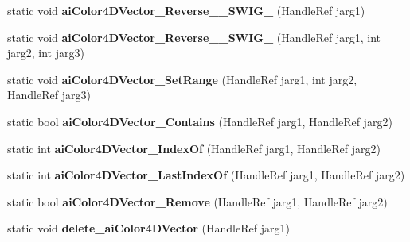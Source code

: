 \begin{DoxyCompactItemize}
\item 
\hypertarget{class_assimp_p_i_n_v_o_k_e_aec77b256902e407fd779185eaf99868b}{static void {\bfseries ai\+Color4\+D\+Vector\+\_\+\+Reverse\+\_\+\+\_\+\+S\+W\+I\+G\+\_} (Handle\+Ref jarg1)}\label{class_assimp_p_i_n_v_o_k_e_aec77b256902e407fd779185eaf99868b}

\item 
\hypertarget{class_assimp_p_i_n_v_o_k_e_acd0caab50df5baad27c1b5d63560a4d6}{static void {\bfseries ai\+Color4\+D\+Vector\+\_\+\+Reverse\+\_\+\+\_\+\+S\+W\+I\+G\+\_} (Handle\+Ref jarg1, int jarg2, int jarg3)}\label{class_assimp_p_i_n_v_o_k_e_acd0caab50df5baad27c1b5d63560a4d6}

\item 
\hypertarget{class_assimp_p_i_n_v_o_k_e_a41fd1f3f39d4473d14f527292f90e19e}{static void {\bfseries ai\+Color4\+D\+Vector\+\_\+\+Set\+Range} (Handle\+Ref jarg1, int jarg2, Handle\+Ref jarg3)}\label{class_assimp_p_i_n_v_o_k_e_a41fd1f3f39d4473d14f527292f90e19e}

\item 
\hypertarget{class_assimp_p_i_n_v_o_k_e_a7430a96d3bccd3f5916248d3041c484f}{static bool {\bfseries ai\+Color4\+D\+Vector\+\_\+\+Contains} (Handle\+Ref jarg1, Handle\+Ref jarg2)}\label{class_assimp_p_i_n_v_o_k_e_a7430a96d3bccd3f5916248d3041c484f}

\item 
\hypertarget{class_assimp_p_i_n_v_o_k_e_a5a31cecb0d33d502757bef87f046ee74}{static int {\bfseries ai\+Color4\+D\+Vector\+\_\+\+Index\+Of} (Handle\+Ref jarg1, Handle\+Ref jarg2)}\label{class_assimp_p_i_n_v_o_k_e_a5a31cecb0d33d502757bef87f046ee74}

\item 
\hypertarget{class_assimp_p_i_n_v_o_k_e_a1b23a1199e11566c93c5d837d62f5f83}{static int {\bfseries ai\+Color4\+D\+Vector\+\_\+\+Last\+Index\+Of} (Handle\+Ref jarg1, Handle\+Ref jarg2)}\label{class_assimp_p_i_n_v_o_k_e_a1b23a1199e11566c93c5d837d62f5f83}

\item 
\hypertarget{class_assimp_p_i_n_v_o_k_e_ab804b4e9c7ec05df9d90be1cc84b0347}{static bool {\bfseries ai\+Color4\+D\+Vector\+\_\+\+Remove} (Handle\+Ref jarg1, Handle\+Ref jarg2)}\label{class_assimp_p_i_n_v_o_k_e_ab804b4e9c7ec05df9d90be1cc84b0347}

\item 
\hypertarget{class_assimp_p_i_n_v_o_k_e_aedb43e8d890d9deabda28acef64c170e}{static void {\bfseries delete\+\_\+ai\+Color4\+D\+Vector} (Handle\+Ref jarg1)}\label{class_assimp_p_i_n_v_o_k_e_aedb43e8d890d9deabda28acef64c170e}


\end{DoxyCompactItemize}
